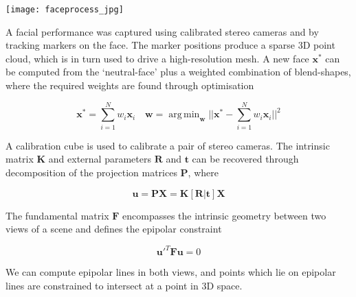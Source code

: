 \documentclass[landscape,a0paper,fontscale=0.285]{baposter} %
\DeclareMathOperator*{\argmin}{arg\,min}
\newcommand{\vect}[1]{\mathbf{#1}}
\begin{document}
\begin{poster}
{\begin{center}
\texttt{[image: faceprocess\_jpg]}
\end{center}

A facial performance was captured using calibrated stereo cameras and by tracking markers on the face. The marker positions produce a sparse 3D point cloud, which is in turn used to drive a high-resolution mesh. A new face $\mathbf{x^*}$ can be computed from the `neutral-face' plus a weighted combination of blend-shapes, where the required weights are found through optimisation

\begin{equation*}
\mathbf{x^*} = \sum^N_{i=1} w_i \mathbf{x}_i \quad
\mathbf{w} =
\argmin_{\mathbf{w}} || \mathbf{x^*} - \sum^N_{i=1} w_i \mathbf{x}_i ||^2
\end{equation*}


A calibration cube is used to calibrate a pair of stereo cameras. The intrinsic matrix $\mathbf{K}$ and external parameters $\mathbf{R}$ and $\mathbf{t}$ can be recovered through decomposition of the projection matrices $\mathbf{P}$, where

\begin{equation*}
	\mathbf{u} = \mathbf{PX} = 
  \vect{K}[\vect{R}|\vect{t}]
    \mathbf{X} 		 
\end{equation*}

The fundamental matrix $\mathbf{F}$ encompasses the intrinsic geometry between two views of a scene and defines the epipolar constraint

\begin{equation*}
\vect{u'}^T \vect{Fu} = 0
\end{equation*}

We can compute epipolar lines in both views, and points which lie on epipolar lines are constrained to intersect at a point in 3D space.

}



\end{poster}
\end{document}
